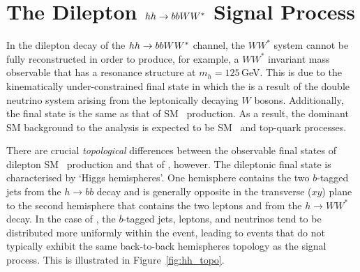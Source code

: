 \section{The Dilepton $hh \rightarrow bbWW^*$ Signal Process}
\label{sec:hh_pheno}


In the dilepton decay of the $hh \rightarrow bbWW^*$ channel, the $WW^*$ system
cannot be fully reconstructed in order to produce, for example, a $WW^*$ invariant
mass observable that has a resonance structure at $m_h = 125$\,GeV.
This is due to the
kinematically under-constrained final state in which the \met is a result of the double neutrino system
arising from the leptonically decaying $W$ bosons.
Additionally, the final state is the same as that of SM \ttbar~production.
As a result, the dominant SM background to the analysis is expected to be SM \ttbar~and top-quark processes.

There are crucial \textit{topological} differences between the observable final states of dilepton SM \ttbar~production and
that of \bbww, however.
The dileptonic \bbww final state is characterised by `Higgs hemispheres'.
One hemisphere contains the two $b$-tagged jets from the $h \rightarrow bb$ decay and is generally
opposite in the transverse ($xy$) plane to the second hemisphere that contains the two leptons
and \met from the $h \rightarrow WW^*$ decay.
In the case of \ttbar, the $b$-tagged jets, leptons, and neutrinos tend to be distributed more uniformly
within the event, leading to events that do not typically exhibit the same back-to-back hemispheres
topology as the \bbww signal process.
This is illustrated in Figure~\ref{fig:hh_topo}.

